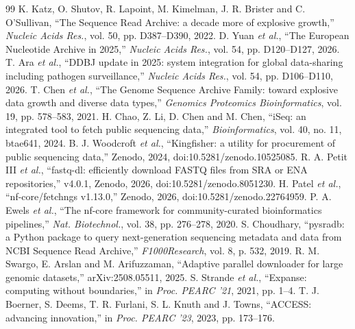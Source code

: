 \documentclass[conference]{IEEEtran}
\begin{document}
\begin{thebibliography}{99}
 K. Katz, O. Shutov, R. Lapoint, M. Kimelman, J. R. Brister and C. O'Sullivan, ``The Sequence Read Archive: a decade more of explosive growth,'' \emph{Nucleic Acids Res.}, vol. 50, pp. D387--D390, 2022.
 D. Yuan \emph{et al.}, ``The European Nucleotide Archive in 2025,'' \emph{Nucleic Acids Res.}, vol. 54, pp. D120--D127, 2026.
 T. Ara \emph{et al.}, ``DDBJ update in 2025: system integration for global data-sharing including pathogen surveillance,'' \emph{Nucleic Acids Res.}, vol. 54, pp. D106--D110, 2026.
 T. Chen \emph{et al.}, ``The Genome Sequence Archive Family: toward explosive data growth and diverse data types,'' \emph{Genomics Proteomics Bioinformatics}, vol. 19, pp. 578--583, 2021.
 H. Chao, Z. Li, D. Chen and M. Chen, ``iSeq: an integrated tool to fetch public sequencing data,'' \emph{Bioinformatics}, vol. 40, no. 11, btae641, 2024.
 B. J. Woodcroft \emph{et al.}, ``Kingfisher: a utility for procurement of public sequencing data,'' Zenodo, 2024, doi:10.5281/zenodo.10525085.
 R. A. Petit III \emph{et al.}, ``fastq-dl: efficiently download FASTQ files from SRA or ENA repositories,'' v4.0.1, Zenodo, 2026, doi:10.5281/zenodo.8051230.
 H. Patel \emph{et al.}, ``nf-core/fetchngs v1.13.0,'' Zenodo, 2026, doi:10.5281/zenodo.22764959.
 P. A. Ewels \emph{et al.}, ``The nf-core framework for community-curated bioinformatics pipelines,'' \emph{Nat. Biotechnol.}, vol. 38, pp. 276--278, 2020.
 S. Choudhary, ``pysradb: a Python package to query next-generation sequencing metadata and data from NCBI Sequence Read Archive,'' \emph{F1000Research}, vol. 8, p. 532, 2019.
 R. M. Swargo, E. Arslan and M. Arifuzzaman, ``Adaptive parallel downloader for large genomic datasets,'' arXiv:2508.05511, 2025.
 S. Strande \emph{et al.}, ``Expanse: computing without boundaries,'' in \emph{Proc. PEARC '21}, 2021, pp. 1--4.
 T. J. Boerner, S. Deems, T. R. Furlani, S. L. Knuth and J. Towns, ``ACCESS: advancing innovation,'' in \emph{Proc. PEARC '23}, 2023, pp. 173--176.
\end{thebibliography}
\end{document}
